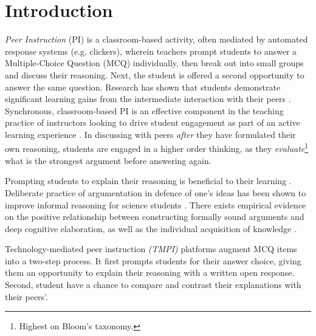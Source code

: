 \documentclass[notitlepage,12pt]{jedm}
\begin{document}
\section{Introduction}\label{sec:intro}

\textit{Peer Instruction} (PI) is a classroom-based activity, often mediated by 
automated response systems (e.g. clickers), wherein teachers prompt students to 
answer a Multiple-Choice Question (MCQ) individually, then break out into small 
groups and discuss their reasoning.
Next, the student is offered a second opportunity to answer the same question.
Research has shown that students demonstrate significant learning gains from 
the intermediate interaction with their peers \cite{crouch_peer_2001}.
Synchronous, classroom-based PI is an effective component in the teaching 
practice of instructors looking to drive student engagement as part of an 
active learning experience \cite{charles_beyond_2015}. 
In discussing with peers \textit{after} they have formulated their own 
reasoning, students are engaged in a higher order thinking, as they \textit{evaluate}\footnote{Highest on Bloom's taxonomy.} what is the strongest argument before answering again.

Prompting students to explain their reasoning is beneficial to their learning 
\cite{chi_eliciting_1994}. 
Deliberate practice of argumentation in defence of one's ideas has been shown 
to improve informal reasoning for science students \cite{venville_impact_2010}.
There exists empirical evidence on the positive relationship between 
constructing formally sound arguments and deep cognitive elaboration, as well 
as the individual acquisition of knowledge \cite{stegmann_collaborative_2012}.

Technology-mediated peer instruction \textit{(TMPI)} platforms 
\cite{charles_harnessing_2019,university_of_british_columbia_ubc/ubcpi_2019}
augment MCQ items into a two-step process.  It first prompts students for 
their answer choice, giving them an opportunity to explain their 
reasoning with a written open response.  Second, student have a chance to compare and 
contrast their explanations with their peers'.
\end{document}
